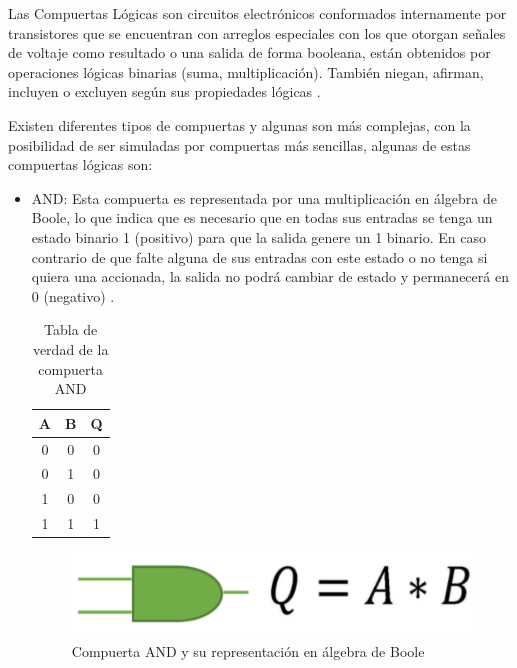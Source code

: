 \documentclass[journal]{IEEEtran}
\begin{document}
	Las Compuertas Lógicas son circuitos electrónicos conformados internamente por transistores que se encuentran con arreglos especiales con los que otorgan señales de voltaje como resultado o una salida de forma booleana, están obtenidos por operaciones lógicas binarias (suma, multiplicación). También niegan, afirman, incluyen o excluyen según sus propiedades lógicas \cite{LOGICBUS}.
	
	\vspace{5mm}
	
	Existen diferentes tipos de compuertas y algunas son más complejas, con la posibilidad de ser simuladas por compuertas más sencillas, algunas de estas compuertas lógicas son:
	
	\begin{itemize}
		
		\item AND: Esta compuerta es representada por una multiplicación en álgebra de Boole, lo que indica que es necesario que en todas sus entradas se tenga un estado binario 1 (positivo) para que la salida genere un 1 binario. En caso contrario de que falte alguna de sus entradas con este estado o no tenga si quiera una accionada, la salida no podrá cambiar de estado y permanecerá en 0 (negativo) \cite{LOGICBUS}.
		
		\begin{table}[ht]
			\centering
			\begin{tabular}{|c|c|c|}
				\hline
				A & B & Q \\
				\hline
				\hline
				0 & 0 & 0 \\
				\hline
				0 & 1 & 0 \\
				\hline
				1 & 0 & 0 \\
				\hline
				1 & 1 & 1 \\
				\hline
			\end{tabular}
			\caption{Tabla de verdad de la compuerta AND}
			\label{tab:AND}
		\end{table}
		
		\begin{figure}[!htb]
			\centering
			\includegraphics[scale = 0.3]{img/AND.png}
			\caption{Compuerta AND y su representación en álgebra de Boole \cite{LOGICBUS}}
			\label{fig:AND}
		\end{figure}
		

\end{itemize}
\end{document}
